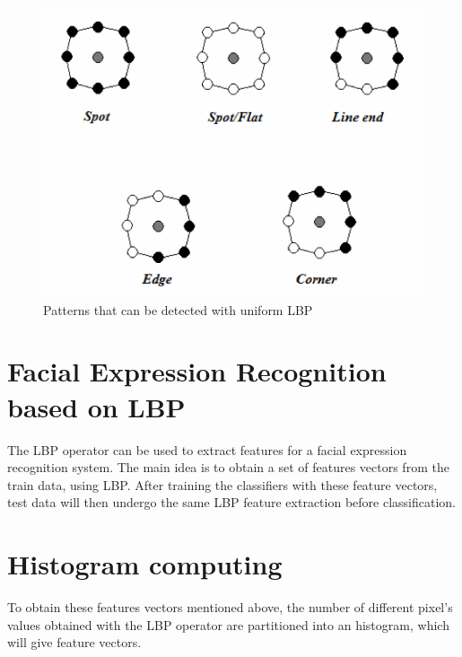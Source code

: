 \begin{figure}[!h]
\begin{center}
\noindent \includegraphics[scale=0.7]{figures/lbp_structural_features} 
\newline
\caption{Patterns that can be detected with uniform LBP}
\label{lbp_structural_features}
\end{center} 
\end{figure}

\section{Facial Expression Recognition based on LBP}

\vspace{\baselineskip}
\noindent The LBP operator can be used to extract features for a facial expression recognition system. The main idea is to obtain a set of features vectors from the train data, using LBP. After training the classifiers with these feature vectors, test data will then undergo the same LBP feature extraction before classification. 
\newline

\section{Histogram computing}

\vspace{\baselineskip}
\noindent To obtain these features vectors mentioned above, the number of different pixel's values  obtained with the LBP operator are partitioned into an histogram, which will give feature vectors.
\newline

